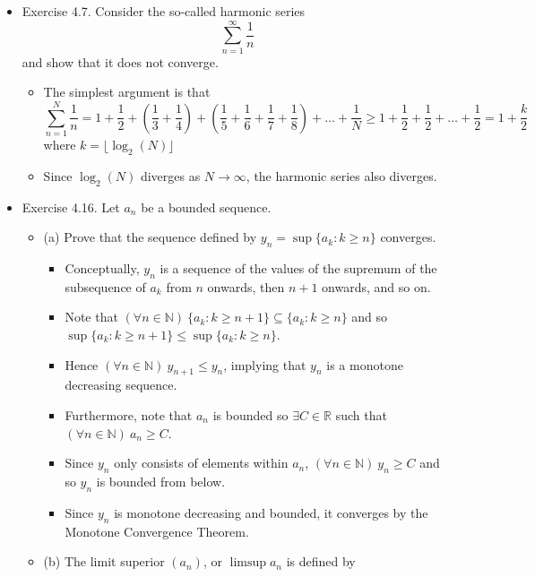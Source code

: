 \documentclass{article}
\begin{document}
\begin{itemize}
\begin{itemize}
\begin{itemize}
        \end{itemize}
    \end{itemize}
    \item Exercise 4.7. Consider the so-called harmonic series
    \[
    \sum_{n=1}^\infty \frac{1}{n}
    \]
    and show that it does not converge.
    \begin{itemize}
        \item The simplest argument is that
        \[
        \sum_{n=1}^N \frac{1}{n} = 1+\frac{1}{2}+\left(\frac{1}{3}+\frac{1}{4}\right)+\left(\frac{1}{5}+\frac{1}{6}+\frac{1}{7}+\frac{1}{8}\right) + \dots + \frac{1}{N} \ge 1 + \frac{1}{2} + \frac{1}{2} + \dots + \frac{1}{2} = 1 + \frac{k}{2}
        \]
        where $k = \lfloor \log_2 (N) \rfloor$
        \item Since $\log_2 (N)$ diverges as $N \rightarrow \infty$, the harmonic series also diverges.
    \end{itemize}
    \item Exercise 4.16. Let $a_n$ be a bounded sequence.
    \begin{itemize}
        \item (a) Prove that the sequence defined by $y_n = \sup \{ a_k : k \ge n \}$ converges.
        \begin{itemize}
            \item Conceptually, $y_n$ is a sequence of the values of the supremum of the subsequence of $a_k$ from $n$ onwards, then $n+1$ onwards, and so on.
            \item Note that $(\forall n \in \mathbb{N}) \ \{ a_k : k \ge n+1 \} \subseteq \{ a_k : k \ge n \}$ and so $\sup \{ a_k : k \ge n+1 \} \le \sup \{ a_k : k \ge n\}$.
            \item Hence $(\forall n \in \mathbb{N}) \ y_{n+1} \le y_n$, implying that $y_n$ is a monotone decreasing sequence.
            \item Furthermore, note that $a_n$ is bounded so $\exists C \in \mathbb{R}$ such that $(\forall n \in \mathbb{N}) \ a_n \ge C$.
            \item Since $y_n$ only consists of elements within $a_n$, $(\forall n \in \mathbb{N}) \ y_n \ge C$ and so $y_n$ is bounded from below.
            \item Since $y_n$ is monotone decreasing and bounded, it converges by the Monotone Convergence Theorem.
        \end{itemize}
        \item (b) The limit superior $(a_n)$, or $\limsup a_n$ is defined by

\end{itemize}
\end{itemize}
\end{document}

